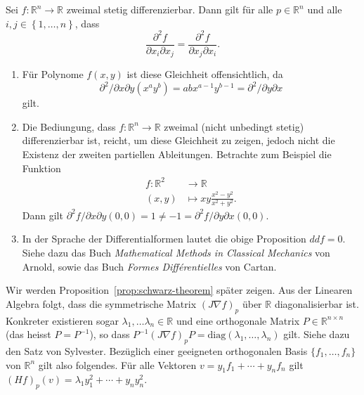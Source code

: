 \documentclass[../main.tex]{subfiles}
\begin{document}
\begin{proposition}\label{prop:schwarz-theorem}
  Sei $f \colon \mathbb{R}^n \to \mathbb{R}$ zweimal stetig differenzierbar.
  Dann gilt für alle $p \in \mathbb{R}^n$ 
  und alle $i, j \in \left\{1, \dots, n \right\}$, dass
  \[
    \frac{\partial^2 f}{\partial x_i \partial x_j}
    =
    \frac{\partial^2 f}{\partial x_j \partial x_i}.
  \]
\end{proposition}

\begin{remark}
  \leavevmode
  \begin{enumerate}[(1)]
    \item Für Polynome $f(x, y)$ ist diese Gleichheit offensichtlich,
      da 
      \[
      \partial^2 / \partial x \partial y (x^a y^b) = ab x^{a-1} y^{b-1}
      = \partial^2 / \partial y \partial x
      \]
      gilt.
    \item
      Die Bediungung, dass $f \colon \mathbb{R}^n \to \mathbb{R}$
      zweimal (nicht unbedingt stetig) differenzierbar ist,
      reicht, um diese Gleichheit zu zeigen, jedoch nicht
      die Existenz der zweiten partiellen Ableitungen.
      Betrachte zum Beispiel die Funktion
      \begin{align*}
        f \colon \mathbb{R}^2 & \to \mathbb{R} \\
        (x, y) & \mapsto xy \frac{x^2 - y^2}{x^2 + y^2}.
      \end{align*}
      Dann gilt $\partial^2 f/ \partial x \partial y (0, 0) = 1
      \neq -1 = \partial^2 f / \partial y \partial x (0, 0)$.
    \item In der Sprache der Differentialformen
      lautet die obige Proposition $ddf = 0$.
      Siehe dazu das Buch \emph{Mathematical Methods in Classical
      Mechanics} von Arnold,
      sowie das Buch \emph{Formes Différentielles} von Cartan.
  \end{enumerate}
  
\end{remark}

Wir werden Proposition~\ref{prop:schwarz-theorem} später zeigen.
Aus der Linearen Algebra folgt, dass
die symmetrische Matrix ${(J \nabla f)}_p$ über $\mathbb{R}$ 
diagonalisierbar ist.
Konkreter existieren sogar
$\lambda_1, \dots \lambda_n \in \mathbb{R}$ und
eine orthogonale Matrix $P \in \mathbb{R}^{n \times n}$ 
(das heisst $P = P^{-1}$), so dass
$P^{-1} {(J \nabla f)}_p P = \text{diag}(\lambda_1, \dots, \lambda_n)$ 
gilt. Siehe dazu den Satz von Sylvester.
Bezüglich einer geeigneten orthogonalen Basis
$\{f_1, \dots, f_n \}$ von $\mathbb{R}^n$ 
gilt also folgendes. Für alle
Vektoren
$v = y_1 f_1 + \cdots + y_n f_n$ gilt
${(Hf)}_p(v) = \lambda_1 y_1^2 + \cdots + y_n y_n^2$.
\end{document}
